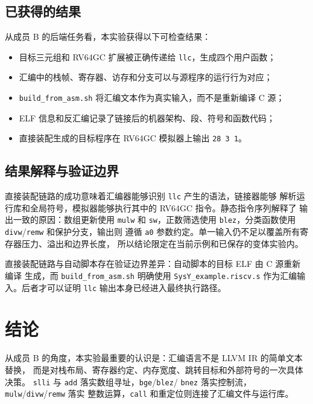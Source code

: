 \documentclass[a4paper]{article}
\begin{document}
\subsection{已获得的结果}

从成员 B 的后端任务看，本实验获得以下可检查结果：

\begin{itemize}
  \item 目标三元组和 RV64GC 扩展被正确传递给 \texttt{llc}，生成四个用户函数；
  \item 汇编中的栈帧、寄存器、访存和分支可以与源程序的运行行为对应；
  \item \texttt{build\_from\_asm.sh} 将汇编文本作为真实输入，而不是重新编译 C 源；
  \item ELF 信息和反汇编记录了链接后的机器架构、段、符号和函数代码；
  \item 直接装配生成的目标程序在 RV64GC 模拟器上输出 \texttt{28 3 1}。
\end{itemize}

\subsection{结果解释与验证边界}

直接装配链路的成功意味着汇编器能够识别 \texttt{llc} 产生的语法，链接器能够
解析运行库和全局符号，模拟器能够执行其中的 RV64GC 指令。静态指令序列解释了
输出一致的原因：数组更新使用 \texttt{mulw} 和 \texttt{sw}，正数筛选使用
\texttt{blez}，分类函数使用 \texttt{divw}/\texttt{remw} 和保护分支，输出则
遵循 \texttt{a0} 参数约定。单一输入仍不足以覆盖所有寄存器压力、溢出和边界长度，
所以结论限定在当前示例和已保存的变体实验内。

直接装配链路与自动脚本存在验证边界差异：自动脚本的目标 ELF 由 C 源重新编译
生成，而 \texttt{build\_from\_asm.sh} 明确使用 \texttt{SysY\_example.riscv.s}
作为汇编输入。后者才可以证明 \texttt{llc} 输出本身已经进入最终执行路径。

\section{结论}

从成员 B 的角度，本实验最重要的认识是：汇编语言不是 LLVM IR 的简单文本替换，
而是对栈布局、寄存器约定、内存宽度、跳转目标和外部符号的一次具体决策。
\texttt{slli} 与 \texttt{add} 落实数组寻址，\texttt{bge}/\texttt{blez}/
\texttt{bnez} 落实控制流，\texttt{mulw}/\texttt{divw}/\texttt{remw} 落实
整数运算，\texttt{call} 和重定位则连接了汇编文件与运行库。
\end{document}

